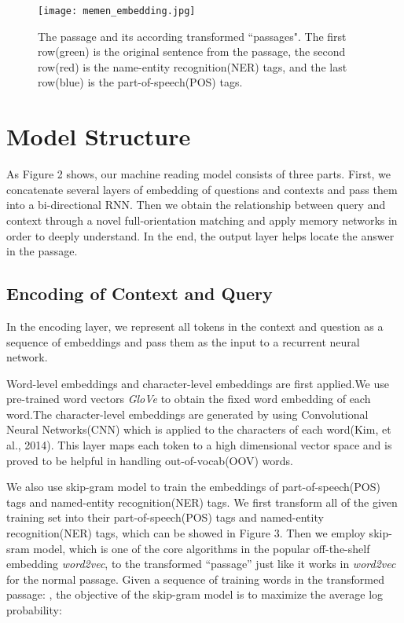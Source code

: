 \documentclass[letterpaper]{article}
\begin{document}
\begin{figure*}[htbp]
  \begin{center}
  \texttt{[image: memen\_embedding.jpg]}
  \caption{The passage and its according transformed ``passages". The first row(green) is the original sentence from the passage, the second row(red) is the name-entity recognition(NER) tags, and the last row(blue) is the part-of-speech(POS) tags.}
  \end{center}
\end{figure*}


\section{Model Structure}
As Figure 2 shows, our machine reading model consists of three parts. First, we concatenate several layers of embedding of questions and contexts and pass them into a bi-directional RNN\citep{mikolov2010recurrent}. Then we obtain the relationship between query and context through a novel full-orientation matching and apply memory networks in order to deeply understand. In the end, the output layer helps locate the answer in the passage.
\subsection{Encoding of Context and Query}
In the encoding layer, we represent all tokens in the context and question as a sequence of embeddings and pass them as the input to a recurrent neural network. 

Word-level embeddings and character-level embeddings are first applied.We use pre-trained word vectors \emph{GloVe}\citep{pennington2014glove} to obtain the fixed word embedding of each word.The character-level embeddings are generated by using Convolutional Neural Networks(CNN) which is applied to the characters of each word(Kim, et al., 2014). This layer maps each token to a high dimensional vector space and is proved to be helpful in handling out-of-vocab(OOV) words.

We also use skip-gram model to train the embeddings of part-of-speech(POS) tags and named-entity recognition(NER) tags. We first transform all of the given training set into their part-of-speech(POS) tags and named-entity recognition(NER) tags, which can be showed in Figure 3. Then we employ skip-sram model, which is one of the core algorithms in the popular off-the-shelf embedding \emph{word2vec}\citep{mikolov2013distributed}, to the transformed ``passage'' just like it works in \emph{word2vec} for the normal passage. Given a sequence of training words in the transformed passage: , the objective of the skip-gram model is to maximize the average log probability:
\end{document}
